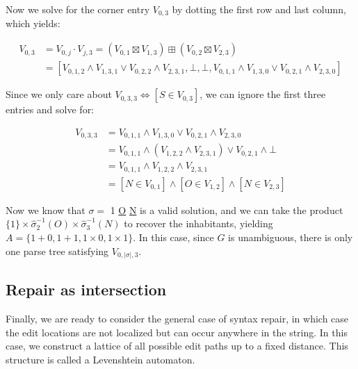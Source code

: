 \documentclass[sigplan,review,acmsmall,nonacm,screen,anonymous]{acmart}\settopmatter{printfolios=false,printccs=false,printacmref=false}
\begin{document}
\noindent Now we solve for the corner entry $V_{0, 3}$ by dotting the first row and last column, which yields:\vspace{-8pt}

\begin{align*}
  V_{0, 3} &= V_{0, j} \cdot V_{j, 3} = (V_{0, 1} \boxtimes V_{1, 3}) \boxplus (V_{0, 2} \boxtimes V_{2, 3})\\
  &= [V_{0, 1, 2} \land V_{1, 3, 1} \lor V_{0, 2, 2} \land V_{2, 3, 1}, \bot, \bot, V_{0, 1, 1} \land V_{1, 3, 0} \lor V_{0, 2, 1} \land V_{2, 3, 0}]
\end{align*}

\noindent Since we only care about $V_{0, 3, 3} \Leftrightarrow [S \in V_{0, 3}]$, we can ignore the first three entries and solve for:\vspace{-8pt}

\begin{align*}
  V_{0, 3, 3} &= V_{0, 1, 1} \land V_{1, 3, 0} \lor V_{0, 2, 1} \land V_{2, 3, 0}\\
  &= V_{0, 1, 1} \land (V_{1, 2, 2} \land V_{2, 3, 1}) \lor V_{0, 2, 1} \land \bot\\
  &= V_{0, 1, 1} \land V_{1, 2, 2} \land V_{2, 3, 1}\\
  &= [N \in V_{0, 1}] \land [O \in V_{1, 2}] \land [N \in V_{2, 3}]
\end{align*}

Now we know that $\sigma =$ 1 \underline{O} \underline{N} is a valid solution, and we can take the product $\{1\}\times \hat\sigma_2^{-1}(O) \times \hat\sigma_3^{-1}(N)$ to recover the inhabitants, yielding $A=\{1+0, 1+1, 1\times 0, 1\times 1\}$. In this case, since $G$ is unambiguous, there is only one parse tree satisfying $V_{0, |\sigma|, 3}$.%

\subsection{Repair as intersection}

Finally, we are ready to consider the general case of syntax repair, in which case the edit locations are not localized but can occur anywhere in the string. In this case, we construct a lattice of all possible edit paths up to a fixed distance. This structure is called a Levenshtein automaton.
\end{document}
